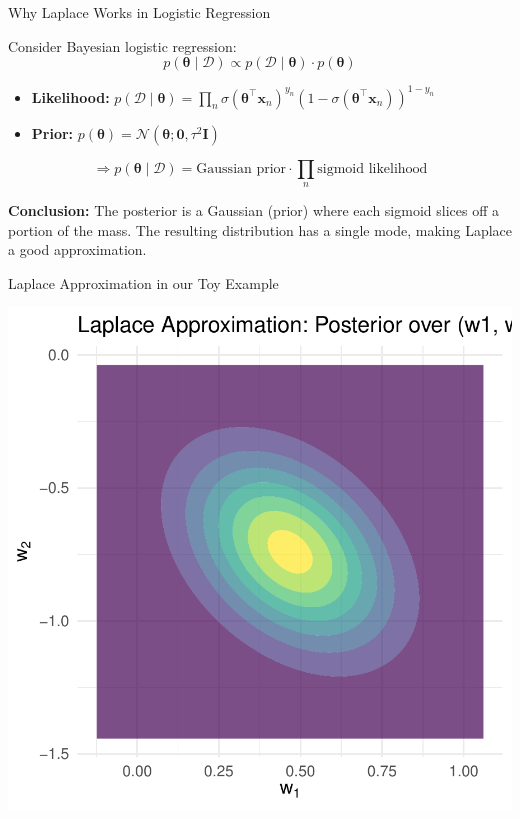 \documentclass{beamer}
\begin{document}
\begin{frame}{Why Laplace Works in Logistic Regression}

Consider Bayesian logistic regression:
\[
p(\boldsymbol{\theta} \mid \mathcal{D}) \propto p(\mathcal{D} \mid \boldsymbol{\theta}) \cdot p(\boldsymbol{\theta})
\]

\medskip

\begin{itemize}
  \item \textbf{Likelihood:} \(p(\mathcal{D} \mid \boldsymbol{\theta}) = \prod_{n} \sigma(\boldsymbol{\theta}^\top \mathbf{x}_n)^{y_n}(1 - \sigma(\boldsymbol{\theta}^\top \mathbf{x}_n))^{1 - y_n}\)
  \item \textbf{Prior:} \(p(\boldsymbol{\theta}) = \mathcal{N}(\boldsymbol{\theta}; \mathbf{0}, \tau^2 \mathbf{I})\)
\end{itemize}

\medskip

\[
\Rightarrow p(\boldsymbol{\theta} \mid \mathcal{D}) = \text{Gaussian prior} \cdot \prod_n \text{sigmoid likelihood}
\]

\medskip

\textbf{Conclusion:} The posterior is a Gaussian (prior) where each sigmoid slices off a portion of the mass. The resulting distribution has a single mode, making Laplace a good approximation.

\end{frame}

\begin{frame}{Laplace Approximation in our Toy Example}

\begin{center}
  \includegraphics[width=0.6\linewidth]{figures/laplace_posterior_contours.pdf}
\end{center}

\end{frame}
\end{document}
